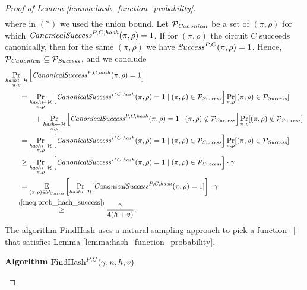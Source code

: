 \begin{proof}[Proof of Lemma \ref{lemma:hash_function_probability}]
\begin{align}
\end{align}
where in $(*)$ we used the union bound.
Let $\mathcal{P}_{\operatorname{\mathit{Canonical}}}$ be a set of $(\pi, \rho)$ for which $\operatorname{\mathit{CanonicalSuccess}}^{P, C, \operatorname{\mathit{hash}}}(\pi, \rho) = 1$.
If for $(\pi, \rho)$ the circuit $C$ succeeds canonically, then for the same $(\pi, \rho)$ we have $\operatorname{\mathit{Success}}^{P, C}(\pi, \rho) = 1$.
Hence, $\mathcal{P}_{\operatorname{\mathit{Canonical}}} \subseteq \mathcal{P}_{\operatorname{\mathit{Success}}}$, and we conclude
\begin{align}
  \label{ineq:hash_high_prob}
&\underset{\substack{\hash \leftarrow \cH \\ \pi, \rho}}{\Pr}\left[\CanonicalSuccess^{P, C, \hash}(\pi, \rho) = 1\right] \notag\\
&\IndI = \underset{\substack{\hash \leftarrow \cH \\ \pi, \rho}}{\Pr}\left[\CanonicalSuccess^{P,C,\hash}(\pi, \rho) = 1 \mid (\pi, \rho) \in \cP_{\mathit{Success}}\right]
\underset{\pi, \rho}{\Pr}[(\pi, \rho) \in \cP_{\mathit{Success}}] \notag\\
&\IndII + \underset{\substack{\hash \leftarrow \cH \\ \pi, \rho}}{\Pr}\left[\CanonicalSuccess^{P,C,\hash}(\pi, \rho) = 1 \mid (\pi, \rho) \notin \cP_{\mathit{Success}} \right]
\underset{\pi, \rho}{\Pr}[(\pi, \rho) \notin \cP_{\mathit{Success}}] \notag\\
%
&\IndI = \underset{\substack{\hash \leftarrow \cH \\ \pi, \rho}}{\Pr}\left[\CanonicalSuccess^{P,C,\hash}(\pi, \rho) = 1 \mid (\pi, \rho) \in \cP_{\mathit{Success}}\right]
\underset{\pi, \rho}{\Pr}[(\pi, \rho) \in \cP_{\mathit{Success}}] \notag\\
%
&\IndI \geq
\underset{\substack{\hash \leftarrow \cH \\ \pi, \rho}}{\Pr}\left[\CanonicalSuccess^{P,C,\hash}(\pi, \rho) = 1 \mid (\pi, \rho) \in \cP_{\mathit{Success}}\right] \cdot \gamma \notag\\
&\IndI =
\underset{(\pi, \rho) \in \cP_{\mathit{Success}}}
{\mathbb{E}}\left[\underset{\hash \leftarrow \cH}{\Pr}[\CanonicalSuccess^{P,C,\hash}(\pi, \rho) = 1] \right] \cdot \gamma \notag\\
&\hphantom{aaa}\stackrel{(\ref{ineq:prob_hash_success})}{\geq} \frac{\gamma}{4(h+v)}. %
\end{align}
The algorithm FindHash uses a natural sampling approach to pick a function $\hash$ that satisfies Lemma \ref{lemma:hash_function_probability}.
\begin{codeblock}
  \textbf{Algorithm} $\operatorname{\text{FindHash}}^{P,C}(\gamma, n, h, v)$

\end{codeblock}
\end{proof}
